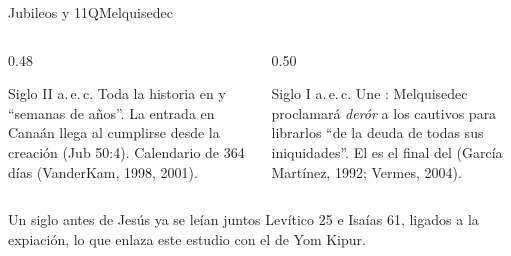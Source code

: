 \begin{frame}{Jubileos y 11QMelquisedec}
\begin{columns}[t,onlytextwidth]
\begin{column}{0.48\textwidth}
\begin{tcolorbox}[colback=papiro,colframe=tierraroja,boxrule=0.8pt,arc=3pt,title={Libro de los Jubileos},fonttitle=\scriptsize\bfseries,coltitle=papiro,colbacktitle=tierraroja,left=3pt,right=3pt]
\scriptsize\RaggedRight Siglo II a.\,e.\,c. Toda la historia en  y ``semanas de años''. La entrada en Canaán llega al cumplirse  desde la creación (Jub 50:4). Calendario de 364 días (VanderKam, 1998, 2001).
\end{tcolorbox}
\end{column}
\begin{column}{0.50\textwidth}
\begin{tcolorbox}[colback=papiro,colframe=tierraroja,boxrule=0.8pt,arc=3pt,title={11QMelquisedec (11Q13)},fonttitle=\scriptsize\bfseries,coltitle=papiro,colbacktitle=tierraroja,left=3pt,right=3pt]
\scriptsize\RaggedRight Siglo I a.\,e.\,c. Une : Melquisedec proclamará \emph{derór} a los cautivos para librarlos ``de la deuda de todas sus iniquidades''. El  es el final del  (García Martínez, 1992; Vermes, 2004).
\end{tcolorbox}
\end{column}
\end{columns}
\medskip
\small\RaggedRight Un siglo antes de Jesús ya se leían juntos Levítico 25 e Isaías 61, ligados a la expiación, lo que enlaza este estudio con el de Yom Kipur.
\end{frame}

